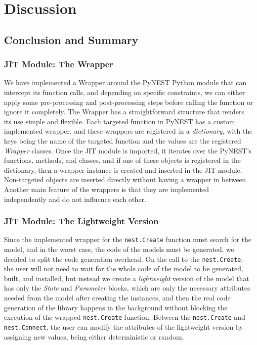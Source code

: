 \chapter{Discussion}
 \label{chap:disc}
\section{Conclusion and Summary}

\subsection*{JIT Module: The Wrapper}

We have implemented a Wrapper around the PyNEST Python module that can intercept its function calls, and depending on specific constraints, we can either apply some pre-processing and post-processing steps before calling the function or ignore it completely. The Wrapper has a straightforward structure that renders its use simple and flexible. Each targeted function in PyNEST has a custom implemented wrapper, and these wrappers are registered in a \emph{dictionary,} with the keys being the name of the targeted function and the values are the registered \emph{Wrapper} classes. Once the JIT module is imported, it iterates over the PyNEST's functions, methods, and classes, and if one of these objects is registered in the dictionary, then a wrapper instance is created and inserted in the JIT module. Non-targeted objects are inserted directly without having a wrapper in between. Another main feature of the wrappers is that they are implemented independently and do not influence each other.

\subsection*{JIT Module: The Lightweight Version}

Since the implemented wrapper for the \texttt{nest.Create} function must search for the model, and in the worst case, the code of the models must be generated, we decided to split the code generation overhead. On the call to the \texttt{nest.Create}, the user will not need to wait for the whole code of the model to be generated, built, and installed, but instead we create a \emph{lightweight} version of the model that has only the \emph{State} and \emph{Parameter} blocks, which are only the necessary attributes needed from the model after creating the instances, and then the real code generation of the library happens in the background without blocking the execution of the wrapped \texttt{nest.Create} function. Between the \texttt{nest.Create} and \texttt{nest.Connect}, the user can modify the attributes of the lightweight version by assigning new values, being either deterministic or random.


